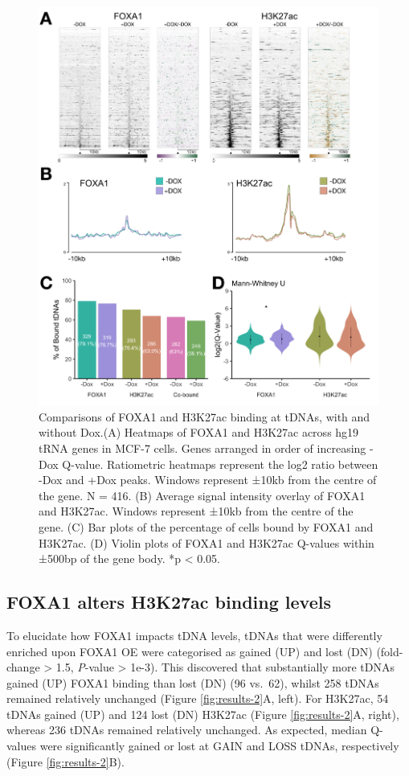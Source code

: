 \documentclass[
  12pt,
]{article}
\begin{document}
\begin{figure}[H]
\includegraphics[width=1\linewidth]{../images/results-01} \caption{Comparisons of FOXA1 and H3K27ac binding at tDNAs, with and without Dox.(A) Heatmaps of FOXA1 and H3K27ac across hg19 tRNA genes in MCF-7 cells. Genes arranged in order of increasing -Dox Q-value. Ratiometric heatmaps represent the log2 ratio between -Dox and +Dox peaks. Windows represent ±10kb from the centre of the gene. N = 416. (B) Average signal intensity overlay of FOXA1 and H3K27ac. Windows represent ±10kb from the centre of the gene. (C) Bar plots of the percentage of cells bound by FOXA1 and H3K27ac. (D) Violin plots of FOXA1 and H3K27ac Q-values within ±500bp of the gene body. *p < 0.05.}\label{fig:results-1}
\end{figure}

\hypertarget{foxa1-alters-h3k27ac-binding-levels}{%
\subsection{FOXA1 alters H3K27ac binding levels}\label{foxa1-alters-h3k27ac-binding-levels}}

To elucidate how FOXA1 impacts tDNA levels, tDNAs that were differently enriched upon FOXA1 OE were categorised as gained (UP) and lost (DN) (fold-change \textgreater{} 1.5, \emph{P}-value \textgreater{} 1e-3).
This discovered that substantially more tDNAs gained (UP) FOXA1 binding than lost (DN) (96 vs.~62), whilst 258 tDNAs remained relatively unchanged (Figure \ref{fig:results-2}A, left).
For H3K27ac, 54 tDNAs gained (UP) and 124 lost (DN) H3K27ac (Figure \ref{fig:results-2}A, right), whereas 236 tDNAs remained relatively unchanged.
As expected, median Q-values were significantly gained or lost at GAIN and LOSS tDNAs, respectively (Figure \ref{fig:results-2}B).
\end{document}
